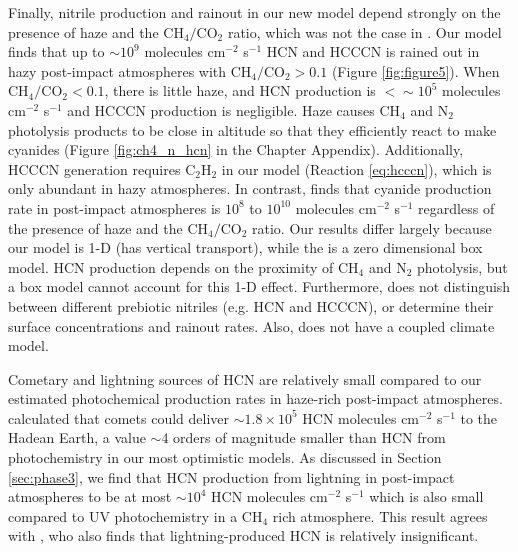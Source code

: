 Finally, nitrile production and rainout in our new model depend strongly on the presence of haze and the $\mathrm{CH_4}/\mathrm{CO_2}$ ratio, which was not the case in \citet{Zahnle_2020}. Our model finds that up to $\sim 10^9$ molecules cm$^{-2}$ s$^{-1}$ HCN and HCCCN is rained out in hazy post-impact atmospheres with $\mathrm{CH_4}/\mathrm{CO_2} > 0.1$ (Figure \ref{fig:figure5}). When $\mathrm{CH_4}/\mathrm{CO_2} < 0.1$, there is little haze, and HCN production is $< \sim 10^5$ molecules cm$^{-2}$ s$^{-1}$ and HCCCN production is negligible. Haze causes CH$_4$ and N$_2$ photolysis products to be close in altitude so that they efficiently react to make cyanides (Figure \ref{fig:ch4_n_hcn} in the Chapter Appendix). Additionally, HCCCN generation requires C$_2$H$_2$ in our model (Reaction \ref{eq:hcccn}), which is only abundant in hazy atmospheres. In contrast, \citet{Zahnle_2020} finds that cyanide production rate in post-impact atmospheres is $10^8$ to $10^{10}$ molecules cm$^{-2}$ s$^{-1}$ regardless of the presence of haze and the $\mathrm{CH_4}/\mathrm{CO_2}$ ratio. Our results differ largely because our model is 1-D (has vertical transport), while the \citet{Zahnle_2020} is a zero dimensional box model. HCN production depends on the proximity of CH$_4$ and N$_2$ photolysis, but a box model cannot account for this 1-D effect. Furthermore, \citet{Zahnle_2020} does not distinguish between different prebiotic nitriles (e.g. HCN and HCCCN), or determine their surface concentrations and rainout rates. Also, \citet{Zahnle_2020} does not have a coupled climate model.

Cometary and lightning sources of HCN are relatively small compared to our estimated photochemical production rates in haze-rich post-impact atmospheres. \citet{Todd_2020} calculated that comets could deliver $\sim 1.8 \times 10^{5}$ HCN molecules cm$^{-2}$ s$^{-1}$ to the Hadean Earth, a value $\sim 4$ orders of magnitude smaller than HCN from photochemistry in our most optimistic models. As discussed in Section \ref{sec:phase3}, we find that HCN production from lightning in post-impact atmospheres to be at most $\sim 10^{4}$ HCN molecules cm$^{-2}$ s$^{-1}$ which is also small compared to UV photochemistry in a CH$_4$ rich atmosphere. This result agrees with \citet{Pearce_2022}, who also finds that lightning-produced HCN is relatively insignificant.

